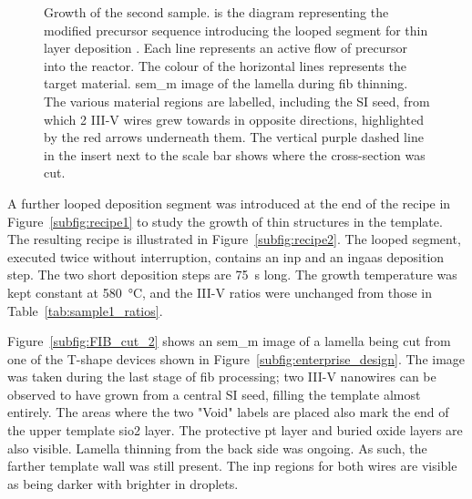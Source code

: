 \begin{figure}
{
    }
    \caption[Precursor sequence and \acs{sem_m}-\acs{fib} image of a cross-section of a wire from sample 2]{Growth of the second sample.  is the diagram representing the modified precursor sequence introducing the looped segment for thin layer deposition \cite{Brugnolotto2023}. Each line represents an active flow of precursor into the reactor. The colour of the horizontal lines represents the target material.  \acs{sem_m} image of the lamella during \acs{fib} thinning. The various material regions are labelled, including the \acs{SI} seed, from which \num{2} III-V wires grew towards in opposite directions, highlighted by the red arrows underneath them. The vertical purple dashed line in the insert next to the scale bar shows where the cross-section was cut.}
    \label{fig:sample2_growth}
\end{figure}

A further looped deposition segment was introduced at the end of the recipe in Figure~\ref{subfig:recipe1} to study the growth of thin structures in the template. The resulting recipe is illustrated in Figure~\ref{subfig:recipe2}. The looped segment, executed twice without interruption, contains an \acs{inp} and an \acs{ingaas} deposition step. The two short deposition steps are \qty{75}{s} long. The growth temperature was kept constant at \qty{580}{\degreeCelsius}, and the III-V ratios were unchanged from those in Table~\ref{tab:sample1_ratios}.

Figure~\ref{subfig:FIB_cut_2} shows an \acs{sem_m} image of a lamella being cut from one of the T-shape devices shown in Figure~\ref{subfig:enterprise_design}. The image was taken during the last stage of \acs{fib} processing; two III-V nanowires can be observed to have grown from a central \acl{SI} seed, filling the template almost entirely. The areas where the two "Void" labels are placed also mark the end of the upper template \acs{sio2} layer. The protective \acl{pt} layer and buried oxide layers are also visible. Lamella thinning from the back side was ongoing. As such, the farther template wall was still present. The \acs{inp} regions for both wires are visible as being darker with brighter \acl{in} droplets.

